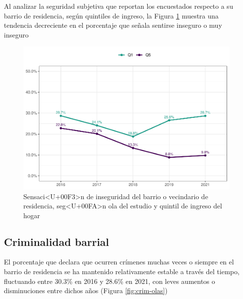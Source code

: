 \documentclass[
  12pt,
]{book}
\begin{document}
Al analizar la seguridad subjetiva que reportan los encuestados respecto a su barrio de residencia, según quintiles de ingreso, la Figura \ref{fig:seguri-quintil} muestra una tendencia decreciente en el porcentaje que señala sentirse inseguro o muy inseguro

\begin{figure}

{\centering \includegraphics{reporte-elsoc_files/figure-latex/seguri-quintil-1} 

}

\caption{Sensaci<U+00F3>n de inseguridad del barrio o vecindario de residencia, seg<U+00FA>n ola del estudio y quintil de ingreso del hogar}\label{fig:seguri-quintil}
\end{figure}

\hypertarget{criminalidad-barrial}{%
\subsection*{Criminalidad barrial}\label{criminalidad-barrial}}

El porcentaje que declara que ocurren crímenes muchas veces o siempre en el barrio de residencia se ha mantenido relativamente estable a través del tiempo, fluctuando entre 30.3\% en 2016 y 28.6\% en 2021, con leves aumentos o disminuciones entre dichos años (Figura \ref{fig:crim-olas})
\end{document}
